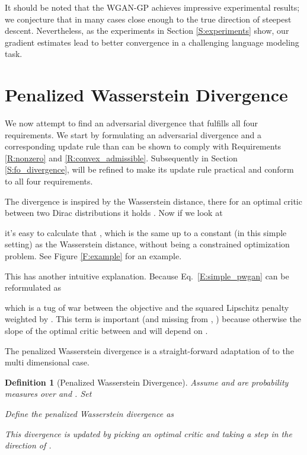 \documentclass{article}
\newtheorem{definition}{Definition}
\begin{document}
It should be noted that the WGAN-GP achieves impressive experimental results; we conjecture that in
many cases  close enough to the true direction of steepest descent.
Nevertheless, as the experiments in Section \ref{S:experiments} show, our gradient estimates lead to better convergence in
a challenging language modeling task.

\section{Penalized Wasserstein Divergence}\label{S:pen_divergence}
 We now attempt to find an adversarial
 divergence that fulfills all four requirements. We start by formulating an adversarial divergence  and a corresponding update rule
 than can be shown to comply with Requirements \ref{R:nonzero} and \ref{R:convex_admissible}.
 Subsequently in Section \ref{S:fo_divergence},  will be refined to make its update rule
 practical and conform to all four requirements.

 The divergence  is inspired by the Wasserstein distance, there for an optimal critic between two Dirac distributions
  it holds . Now if we look at
 
 it's easy to calculate that , which is the same up to a constant (in this simple setting)
 as the Wasserstein distance, without being a constrained optimization problem. See Figure \ref{F:example} for an example.

 This has another intuitive explanation. Because Eq.\ \ref{E:simple_pwgan} can be reformulated as
 
 which is a tug of war between the objective  and the squared Lipschitz penalty  weighted by .
 This  term is important (and missing from \cite{gulrajani2017improved}, \cite{petzka2017regularization})
 because otherwise the slope of the optimal critic between  and  will depend on .

 The penalized Wasserstein divergence  is a straight-forward adaptation of  to the multi dimensional case.
 \begin{definition}[Penalized Wasserstein Divergence]\label{D:pen_divergence}
  Assume  and  are probability measures over  
  and . Set
  
  Define the penalized Wasserstein divergence as
  
  This divergence is updated by picking an optimal critic 
  and taking a step in the direction of .
 \end{definition}
\end{document}

